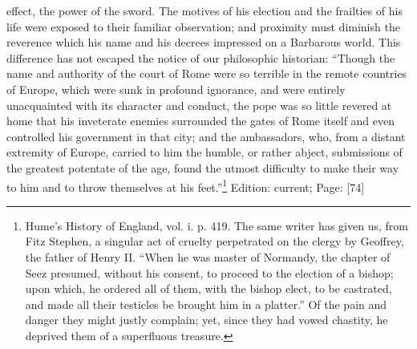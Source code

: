 effect, the power of the sword. The motives of his election and the frailties of his life were exposed to their familiar observation; and proximity must diminish the reverence which his name and his decrees impressed on a Barbarous world. This difference has not escaped the notice of our philosophic historian: \texthebrew{“}Though the name and authority of the court of Rome were so terrible in the remote countries of Europe, which were sunk in profound ignorance, and were entirely unacquainted with its character and conduct, the pope was so little revered at home that his inveterate enemies surrounded the gates of Rome itself and even controlled his government in that city; and the ambassadors, who, from a distant extremity of Europe, carried to him the humble, or rather abject, submissions of the greatest potentate of the age, found the utmost difficulty to make their way to him and to throw themselves at his feet.\texthebrew{}”\footnote{Hume\texthebrew{}’s History of England, vol. i. p. 419. The same writer has given us, from Fitz Stephen, a singular act of cruelty perpetrated on the clergy by Geoffrey, the father of Henry II. \texthebrew{“}When he was master of Normandy, the chapter of Seez presumed, without his consent, to proceed to the election of a bishop; upon which, he ordered all of them, with the bishop elect, to be castrated, and made all their testicles be brought him in a platter.\texthebrew{}” Of the pain and danger they might justly complain; yet, since they had vowed chastity, he deprived them of a superfluous treasure.}
Edition: current; Page: [74]

